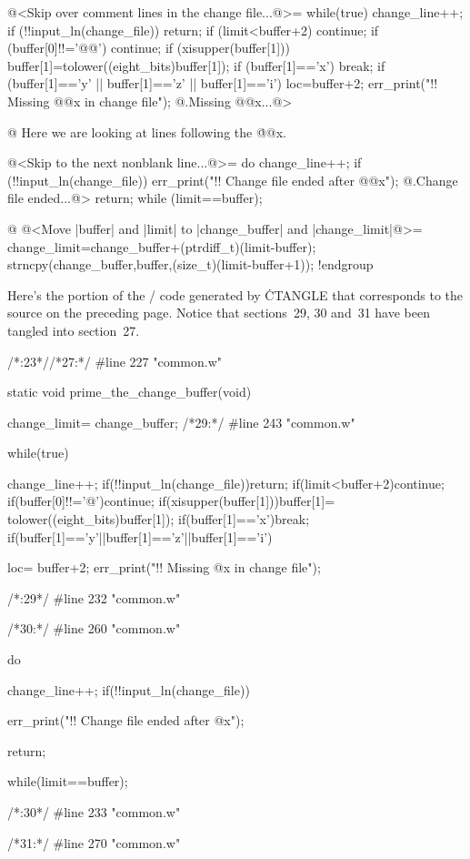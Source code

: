 {@<Skip over comment lines in the change file...@>=
while(true) {
  change_line++;
  if (!!input_ln(change_file)) return;
  if (limit<buffer+2) continue;
  if (buffer[0]!!='@@') continue;
  if (xisupper(buffer[1])) buffer[1]=tolower((eight_bits)buffer[1]);
  if (buffer[1]=='x') break;
  if (buffer[1]=='y' || buffer[1]=='z' || buffer[1]=='i') {
    loc=buffer+2;
    err_print("!! Missing @@x in change file");
@.Missing @@x...@>
  }
}

@ Here we are looking at lines following the \.{@@x}.

@<Skip to the next nonblank line...@>=
do {
  change_line++;
  if (!!input_ln(change_file)) {
    err_print("!! Change file ended after @@x");
@.Change file ended...@>
    return;
  }
} while (limit==buffer);

@ @<Move |buffer| and |limit| to |change_buffer| and |change_limit|@>=
{
  change_limit=change_buffer+(ptrdiff_t)(limit-buffer);
  strncpy(change_buffer,buffer,(size_t)(limit-buffer+1));
}
!endgroup
\endgroup
\vfill\eject

\def\runninghead{APPENDIX A  --- TRANSLATION BY {\tentt CTANGLE}}

Here's the portion of the \CEE/ code generated by \.{CTANGLE} that corresponds
to the source on the preceding page.  Notice that sections~29, 30 and~31
have been tangled into section~27.

\vskip6pt
\begingroup \def\tt{\eighttt} \baselineskip9pt
\verbatim
/*:23*//*27:*/
#line 227 "common.w"

static void
prime_the_change_buffer(void)
{
change_limit= change_buffer;
/*29:*/
#line 243 "common.w"

while(true){
change_line++;
if(!!input_ln(change_file))return;
if(limit<buffer+2)continue;
if(buffer[0]!!='@')continue;
if(xisupper(buffer[1]))buffer[1]= tolower((eight_bits)buffer[1]);
if(buffer[1]=='x')break;
if(buffer[1]=='y'||buffer[1]=='z'||buffer[1]=='i'){
loc= buffer+2;
err_print("!! Missing @x in change file");

}
}

/*:29*/
#line 232 "common.w"

/*30:*/
#line 260 "common.w"

do{
change_line++;
if(!!input_ln(change_file)){
err_print("!! Change file ended after @x");

return;
}
}while(limit==buffer);

/*:30*/
#line 233 "common.w"

/*31:*/
#line 270 "common.w"

}}
